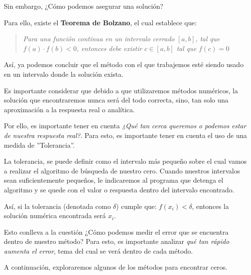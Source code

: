 Sin embargo, ¿Cómo podemos asegurar una solución?

Para ello, existe el \textbf{Teorema de Bolzano}, el cual establece que:

\begin{quote}
\textit{Para una función continua en un intervalo cerrado $[a,b]$, tal que $f(a) \cdot f(b) < 0$, entonces debe existir $c \in [a,b]$ tal que $f(c) = 0$}
\end{quote}

Así, ya podemos concluir que el método con el que trabajemos esté siendo usado en un intervalo donde la solución exista.

Es importante considerar que debido a que utilizaremos métodos numéricos, la solución que encontraremos nunca será del todo correcta, sino, tan solo una aproximación a la respuesta real o analítica.

Por ello, es importante tener en cuenta \textit{¿Qué tan cerca queremos o podemos estar de nuestra respuesta real?}. Para esto, es importante tener en cuenta el uso de una medida de ''Tolerancia''.

La tolerancia, se puede definir como el intervalo más pequeño sobre el cual vamos a realizar el algoritmo de búsqueda de nuestro cero. Cuando nuestros intervalos sean suficientemente pequeños, le indicaremos al programa que detenga el algoritmo y se quede con el valor o respuesta dentro del intervalo encontrado.

Así, si la tolerancia (denotada como $\delta$) cumple que: $f(x_i) < \delta$, entonces la solución numérica encontrada será $x_i$.

Esto conlleva a la cuestión ¿Cómo podemos medir el error que se encuentra dentro de nuestro método?
Para esto, es importante analizar \textit{qué tan rápido aumenta el error}, tema del cual se verá dentro de cada método.

A continuación, exploraremos algunos de los métodos para encontrar ceros.
